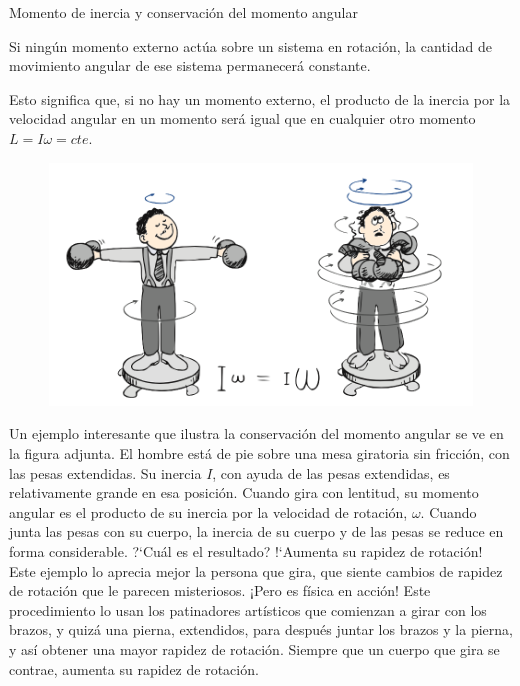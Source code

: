 \newpage %

\begin{myblock}{Momento de inercia y conservación del momento angular}

\vspace{2mm} \small{Si ningún momento externo actúa sobre un sistema en rotación, la cantidad de movimiento angular de ese sistema permanecerá constante.} 

\vspace{2mm} \small{Esto significa que, si no hay un momento externo, el producto de la inercia por la velocidad angular en un momento será igual que en cualquier otro momento $L=I\omega=cte$.}


\begin{figure}[H]
	\centering
	\includegraphics[width=.9\textwidth]{imagenes/imagenes16/T16IM07.png}
\end{figure}


\vspace{2mm} \small{Un ejemplo interesante que ilustra la conservación del momento angular se ve en la figura adjunta. El hombre está de pie sobre una mesa giratoria sin fricción, con las pesas extendidas. Su inercia $I$, con ayuda de las pesas extendidas, es relativamente grande en esa posición. Cuando gira con lentitud, su momento angular es el producto de su inercia por la velocidad de rotación, $\omega$. Cuando junta las pesas con su cuerpo, la inercia de su cuerpo y de las pesas se reduce en forma considerable. ?`Cuál es el resultado? !`Aumenta su rapidez de rotación! Este ejemplo lo aprecia mejor la persona que gira, que siente cambios de rapidez de rotación que le parecen misteriosos. ¡Pero es física en acción! Este procedimiento lo usan los patinadores artísticos que comienzan a girar con los brazos, y quizá una pierna, extendidos, para después juntar los brazos y la pierna, y así obtener una mayor rapidez de rotación. Siempre que un cuerpo que gira se contrae, aumenta su rapidez de rotación}\normalsize{.} 
	
\end{myblock}


